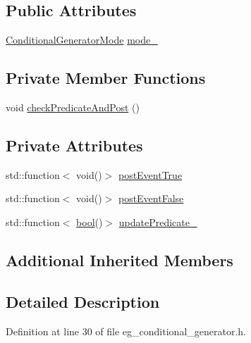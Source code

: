 \subsection*{Public Attributes}
\begin{DoxyCompactItemize}
\item 
\hyperlink{namespacesmacc_1_1event__generators_a1a57548759d7458f91c299f4fc2c5ea4}{Conditional\+Generator\+Mode} \hyperlink{classsmacc_1_1event__generators_1_1EgConditionalGenerator_a5f3e7b602c4d250c54bec0d681d2cb80}{mode\+\_\+}
\end{DoxyCompactItemize}
\subsection*{Private Member Functions}
\begin{DoxyCompactItemize}
\item 
void \hyperlink{classsmacc_1_1event__generators_1_1EgConditionalGenerator_a2a7e8a3818ffd1899682be9bbb8ae339}{check\+Predicate\+And\+Post} ()
\end{DoxyCompactItemize}
\subsection*{Private Attributes}
\begin{DoxyCompactItemize}
\item 
std\+::function$<$ void()$>$ \hyperlink{classsmacc_1_1event__generators_1_1EgConditionalGenerator_a888c44b5585274947b57143611a8670d}{post\+Event\+True}
\item 
std\+::function$<$ void()$>$ \hyperlink{classsmacc_1_1event__generators_1_1EgConditionalGenerator_ac45d7b197cc4cf361602c72dc85ed62a}{post\+Event\+False}
\item 
std\+::function$<$ \hyperlink{classbool}{bool}()$>$ \hyperlink{classsmacc_1_1event__generators_1_1EgConditionalGenerator_a4e4092ecfa7278deda39e8ade6455362}{update\+Predicate\+\_\+}
\end{DoxyCompactItemize}
\subsection*{Additional Inherited Members}


\subsection{Detailed Description}


Definition at line 30 of file eg\+\_\+conditional\+\_\+generator.\+h.




